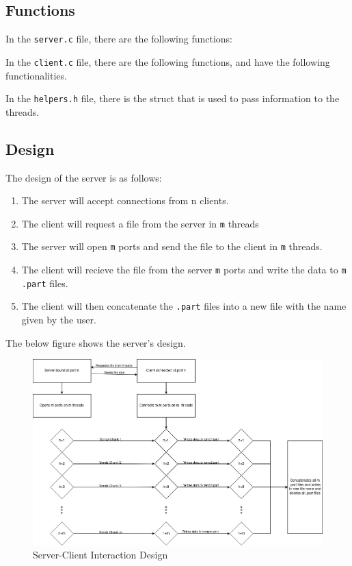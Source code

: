 \documentclass{article}
\begin{document}
\subsection{Functions}
In the \texttt{server.c} file, there are the following functions:

In the \texttt{client.c} file, there are the following functions, and have the following functionalities.

In the \texttt{helpers.h} file, there is the struct that is used to pass information to the threads.

\newpage
\subsection{Design}
The design of the server is as follows:
\begin{enumerate}
    \item The server will accept connections from n clients.
    \item The client will request a file from the server in \texttt{m} threads
    \item The server will open \texttt{m} ports and send the file to the client in \texttt{m} threads.
    \item The client will recieve the file from the server \texttt{m} ports and write the data to \texttt{m .part} files.
    \item The client will then concatenate the \texttt{.part} files into a new file with the name given by the user.
\end{enumerate}
The below figure shows the server's design.
\begin{figure}[h!]
    \centering
    \includegraphics[scale=0.4]{design.png}
    \caption{Server-Client Interaction Design}
\end{figure}
\end{document}
